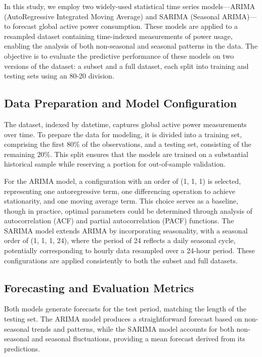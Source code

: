 	In this study, we employ two widely-used statistical time series models—ARIMA (AutoRegressive Integrated Moving Average) and SARIMA (Seasonal ARIMA)—to forecast global active power consumption. These models are applied to a resampled dataset containing time-indexed measurements of power usage, enabling the analysis of both non-seasonal and seasonal patterns in the data. The objective is to evaluate the predictive performance of these models on two versions of the dataset: a subset and a full dataset, each split into training and testing sets using an 80-20 division.
	
	\subsection{Data Preparation and Model Configuration}
	
	The dataset, indexed by datetime, captures global active power measurements over time. To prepare the data for modeling, it is divided into a training set, comprising the first 80\% of the observations, and a testing set, consisting of the remaining 20\%. This split ensures that the models are trained on a substantial historical sample while reserving a portion for out-of-sample validation.
	
	For the ARIMA model, a configuration with an order of (1, 1, 1) is selected, representing one autoregressive term, one differencing operation to achieve stationarity, and one moving average term. This choice serves as a baseline, though in practice, optimal parameters could be determined through analysis of autocorrelation (ACF) and partial autocorrelation (PACF) functions. The SARIMA model extends ARIMA by incorporating seasonality, with a seasonal order of (1, 1, 1, 24), where the period of 24 reflects a daily seasonal cycle, potentially corresponding to hourly data resampled over a 24-hour period. These configurations are applied consistently to both the subset and full datasets.
	
	\subsection{Forecasting and Evaluation Metrics}
	
	Both models generate forecasts for the test period, matching the length of the testing set. The ARIMA model produces a straightforward forecast based on non-seasonal trends and patterns, while the SARIMA model accounts for both non-seasonal and seasonal fluctuations, providing a mean forecast derived from its predictions.
	

